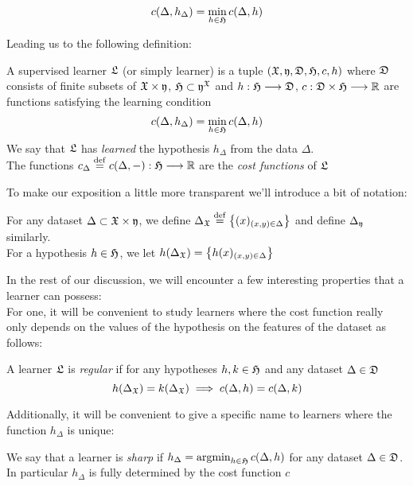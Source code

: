 \begin{equation} \label{eq:learningcondition}
	c(\Delta,h_\Delta)=\min_{h\in \mathfrak{H}} c(\Delta,h)
\end{equation}

\noindent Leading us to the following definition:


\begin{definition}\label{sl:def:supervisedlearner}
A supervised learner  $\mathfrak{L}$ (or simply learner) is a tuple $(\mathfrak{X},\mathfrak{y},\mathfrak{D},\mathfrak{H},c,h)$ where $\mathfrak{D}$ consists of finite subsets of $\mathfrak{X}\times \mathfrak{y}$,  $\mathfrak{H}\subset \mathfrak{y}^{\mathfrak{X}}$  and $h:\mathfrak{H}\longrightarrow \mathfrak{D}$, $c: \mathfrak{D}\times \mathfrak{H}\longrightarrow \mathbb{R}$ are functions satisfying the learning condition
\[
	c(\Delta,h_\Delta)=\min_{h\in \mathfrak{H}} c(\Delta,h)
\]
We say that $\mathfrak{L}$ has \emph{learned} the hypothesis $h_\Delta$ from the data $\Delta$.\\
The functions $c_\Delta\stackrel{\operatorname{def}}{=} c(\Delta,-): \mathfrak{H}\longrightarrow \mathbb{R}$ are the \emph{cost functions} of $\mathfrak{L}$
\end{definition}
\noindent To make our exposition a little more transparent we'll introduce a bit of notation: 


\begin{notation}\label{not:Delta}
	For any dataset $\Delta \subset \mathfrak{X}\times \mathfrak{y}$, we define $\Delta_{\mathfrak{X}}\stackrel{\operatorname{def}}{=}\big\{(x)_{(x,y)\in \Delta}\big\}$ and define $\Delta_{\mathfrak{y}}$ similarly.\\
	For a hypothesis $h\in \mathfrak{H}$, we let $h(\Delta_{\mathfrak{X}})= \big\{h(x)_{(x,y)\in \Delta}\big\}$
\end{notation}

In the rest of our discussion, we will encounter a few interesting properties that a learner can possess:\\ 
\noindent For one, it will be convenient to study learners where the cost function really only depends on the values of the hypothesis on the features of the dataset as follows:


\begin{definition}\label{def:regularlearner}
	A learner $\mathfrak{L}$ is \emph{regular} if for any hypotheses $h,k \in \mathfrak{H}$ and any dataset $\Delta \in \mathfrak{D}$
	\[
	h(\Delta_{\mathfrak{X}})= k(\Delta_{\mathfrak{X}})\implies c(\Delta,h)=c(\Delta,k)
	\]
\end{definition}

Additionally, it will be convenient to give a specific name to learners where the function $h_\Delta$ is unique:
\begin{definition}\label{def:sharp}
We say that a learner is \emph{sharp} if $h_\Delta=\operatorname{argmin}_{h\in \mathfrak{H}} c(\Delta,h)$ for any dataset $\Delta \in \mathfrak{D}$.\\
 In particular $h_\Delta$ is fully determined by the cost function $c$
\end{definition}



